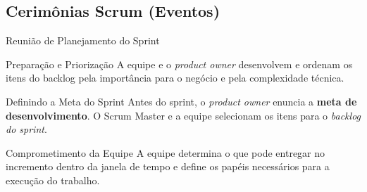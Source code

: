 \documentclass[aspectratio=169, 9pt]{beamer}
\begin{document}
\subsection{Cerimônias Scrum (Eventos)}
\begin{frame}{Reunião de Planejamento do Sprint}
  \begin{block}{Preparação e Priorização}
    A equipe e o \textit{product owner} desenvolvem e ordenam os itens do backlog pela importância para o negócio e pela complexidade técnica.
  \end{block}

  \vspace{0.2cm}
  \begin{block}{Definindo a Meta do Sprint}
    Antes do sprint, o \textit{product owner} enuncia a \textbf{meta de desenvolvimento}. O Scrum Master e a equipe selecionam os itens para o \textit{backlog do sprint}.
  \end{block}

  \vspace{0.2cm}
  \begin{block}{Comprometimento da Equipe}
    A equipe determina o que pode entregar no incremento dentro da janela de tempo e define os papéis necessários para a execução do trabalho.
  \end{block}
\end{frame}
\end{document}
